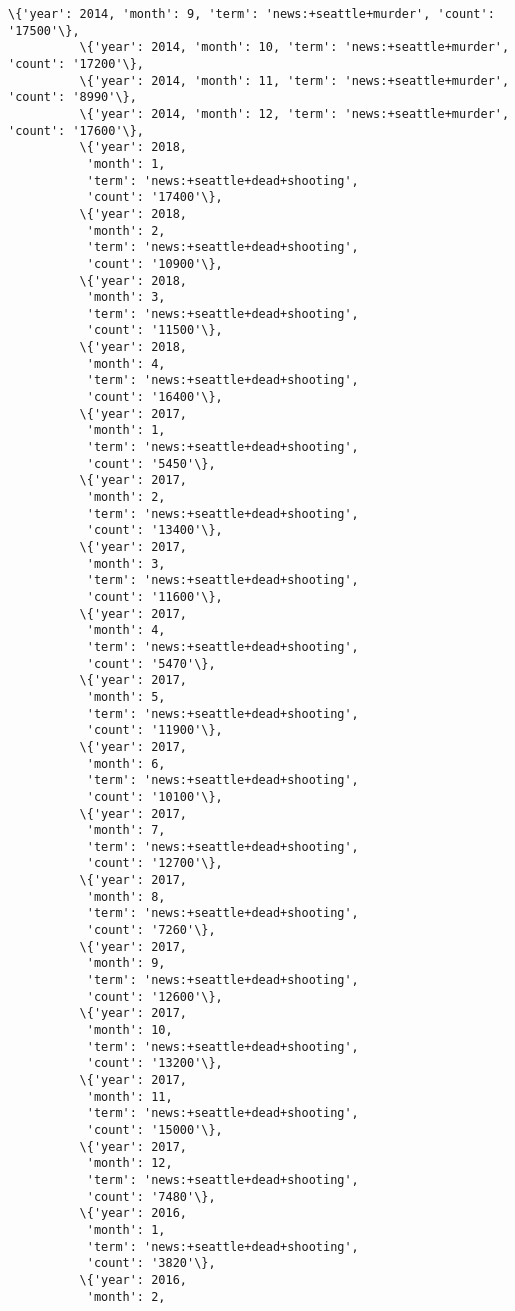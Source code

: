 \documentclass[11pt]{article}
\begin{document}
\begin{Verbatim}[commandchars=\\\{\}]
          \{'year': 2014, 'month': 9, 'term': 'news:+seattle+murder', 'count': '17500'\},
          \{'year': 2014, 'month': 10, 'term': 'news:+seattle+murder', 'count': '17200'\},
          \{'year': 2014, 'month': 11, 'term': 'news:+seattle+murder', 'count': '8990'\},
          \{'year': 2014, 'month': 12, 'term': 'news:+seattle+murder', 'count': '17600'\},
          \{'year': 2018,
           'month': 1,
           'term': 'news:+seattle+dead+shooting',
           'count': '17400'\},
          \{'year': 2018,
           'month': 2,
           'term': 'news:+seattle+dead+shooting',
           'count': '10900'\},
          \{'year': 2018,
           'month': 3,
           'term': 'news:+seattle+dead+shooting',
           'count': '11500'\},
          \{'year': 2018,
           'month': 4,
           'term': 'news:+seattle+dead+shooting',
           'count': '16400'\},
          \{'year': 2017,
           'month': 1,
           'term': 'news:+seattle+dead+shooting',
           'count': '5450'\},
          \{'year': 2017,
           'month': 2,
           'term': 'news:+seattle+dead+shooting',
           'count': '13400'\},
          \{'year': 2017,
           'month': 3,
           'term': 'news:+seattle+dead+shooting',
           'count': '11600'\},
          \{'year': 2017,
           'month': 4,
           'term': 'news:+seattle+dead+shooting',
           'count': '5470'\},
          \{'year': 2017,
           'month': 5,
           'term': 'news:+seattle+dead+shooting',
           'count': '11900'\},
          \{'year': 2017,
           'month': 6,
           'term': 'news:+seattle+dead+shooting',
           'count': '10100'\},
          \{'year': 2017,
           'month': 7,
           'term': 'news:+seattle+dead+shooting',
           'count': '12700'\},
          \{'year': 2017,
           'month': 8,
           'term': 'news:+seattle+dead+shooting',
           'count': '7260'\},
          \{'year': 2017,
           'month': 9,
           'term': 'news:+seattle+dead+shooting',
           'count': '12600'\},
          \{'year': 2017,
           'month': 10,
           'term': 'news:+seattle+dead+shooting',
           'count': '13200'\},
          \{'year': 2017,
           'month': 11,
           'term': 'news:+seattle+dead+shooting',
           'count': '15000'\},
          \{'year': 2017,
           'month': 12,
           'term': 'news:+seattle+dead+shooting',
           'count': '7480'\},
          \{'year': 2016,
           'month': 1,
           'term': 'news:+seattle+dead+shooting',
           'count': '3820'\},
          \{'year': 2016,
           'month': 2,

\end{Verbatim}
\end{document}
